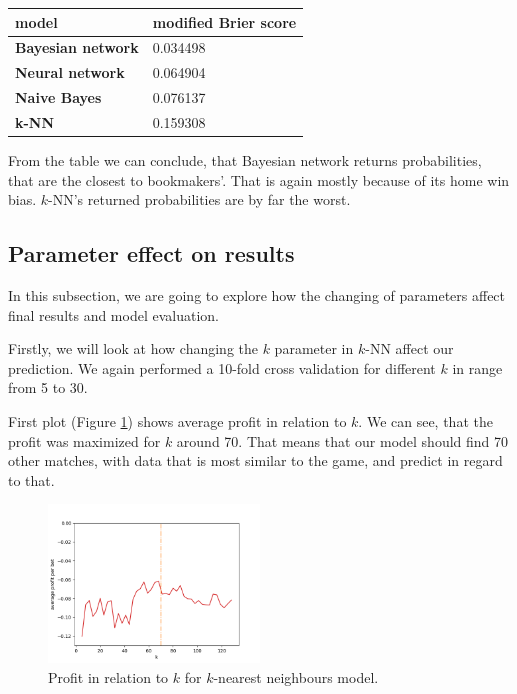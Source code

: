 \documentclass[conference]{IEEEtran}
\begin{document}
\begin{table}[!ht]
    \centering
    \begin{tabular}{|l|l|}
    \hline
        \textbf{model} & modified Brier score \\ \hline
        \textbf{Bayesian network} & 0.034498 \\ \hline
        \textbf{Neural network} & 0.064904 \\ \hline
        \textbf{Naive Bayes} & 0.076137 \\ \hline
        \textbf{k-NN} & 0.159308 \\ \hline
    \end{tabular}
\end{table}

From the table we can conclude, that Bayesian network returns probabilities, that are the 
closest to bookmakers'. That is again mostly because of its home win bias. 
$k$-NN's returned probabilities are by far the worst.

\subsection{Parameter effect on results}

In this subsection, we are going to explore how the changing of parameters affect final 
results and model evaluation. 

Firstly, we will look at how changing the $k$ parameter in $k$-NN affect our prediction.
We again performed a 10-fold cross validation for different $k$ in range from 5 to 30.

First plot (Figure \ref{profit-knn}) shows average profit in relation to $k$. We can see, 
that the profit was maximized for $k$ around 70. That means that our model should find 70 
other matches, with data that is most similar to the game, and predict in regard to that.

\begin{figure}[!ht]
\includegraphics[width=0.5\textwidth]{profit_k_knn.png}
\caption{Profit in relation to $k$ for $k$-nearest neighbours model.}
\label{profit-knn}
\end{figure}
\end{document}
